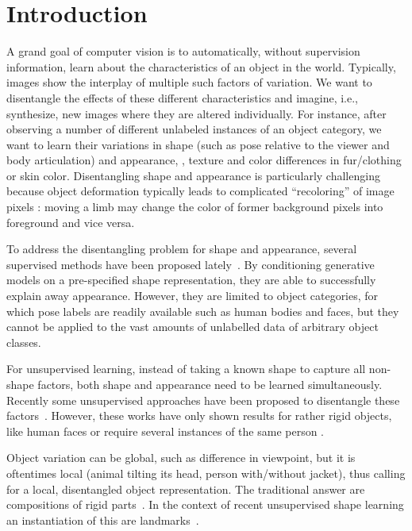 \section{Introduction}

A grand goal of computer vision is to automatically, without supervision information, learn about the characteristics of an object in the world.  Typically, images show the interplay of multiple such factors of variation. We
want to disentangle \cite{Desjardins2012dr, Bengio2013rep, Chen2016infogan, Higgins2016betavae, Eastwood2018dr} the effects of these different characteristics and imagine, i.e., synthesize, new images where they are altered individually. For instance, after observing a number of different unlabeled instances of an object category, we want to learn their variations in shape (such as pose relative to the viewer and body articulation) and appearance, \eg, texture and color differences in fur/clothing or skin color. Disentangling shape and appearance is particularly challenging because object deformation typically leads to complicated
\enquote{recoloring} of image pixels \cite{Shu:2018ua,Esser:2018ue}: moving a limb may change the color of former background pixels into foreground and vice versa.

To address the disentangling problem for shape and appearance, several supervised methods have been proposed lately~\cite{Ma:2017wq, Ma:2017uu, deBem:2018wp, Esser:2018ue, Siarohin:2018wk, Balakrishnan:2018wo}. By conditioning generative models on a pre-specified shape representation, they are able to successfully explain away appearance. However, they are limited to object categories, for which pose labels are readily available such as human bodies and faces, but they cannot be applied to the vast amounts of unlabelled data of arbitrary object classes.

For unsupervised learning, instead of taking a known shape to capture all non-shape factors, both shape and appearance need to be learned  simultaneously.
Recently some unsupervised approaches have been proposed to disentangle these factors~\cite{Shu:2018ua, Xing:2018un}. However, these works have only shown results for rather rigid objects, like human faces or require several instances of the same person \cite{Denton:2017uf}.

Object variation can be global, such as difference in viewpoint, but it is oftentimes local (animal tilting its head, person with/without jacket), thus calling for a local, disentangled object representation. %
The traditional answer are compositions of rigid parts~\cite{Fischler1973rep, Fergus2003object, Felzenszwalb:2010ve}.
In the context of recent unsupervised shape learning an instantiation
of this are landmarks~\cite{Thewlis:2017wi, Zhang:2018vz, Jakab:2018wc}. %

